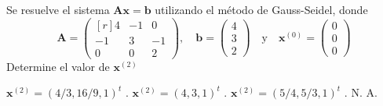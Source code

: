 \begin{pregunta}
\begin{cuerpo}
Se resuelve el sistema $\boldsymbol{A} \boldsymbol{x} = \boldsymbol{b}$ utilizando el m\'etodo de Gauss-Seidel,  donde
\begin{equation*}
\boldsymbol{A} = \begin{pmatrix*}[r]
  4  & -1 & 0 \\
 -1  &3  &-1\\
  0	 &0  &2
\end{pmatrix*}, \quad
\boldsymbol{b} = \begin{pmatrix}
 4   \\
 3  \\
  2		
\end{pmatrix} \quad \textrm{y} \quad
\boldsymbol{x}^{(0)} = \begin{pmatrix}
 0   \\
 0  \\
  0		
\end{pmatrix}
\end{equation*}
Determine el valor de $\boldsymbol{x}^{(2)}$ 
\end{cuerpo}
\begin{multicols}{2}
\begin{alternativas}
{$\boldsymbol{x}^{(2)} = (4/3,16/9,1)^t$ .} %
{$\boldsymbol{x}^{(2)} = (4,3,1)^t$ .}
{$\boldsymbol{x}^{(2)} = (5/4,5/3,1)^t$ .}
{N. A.}
\end{alternativas}
\end{multicols}
\justificacion{7cm}
\end{pregunta}